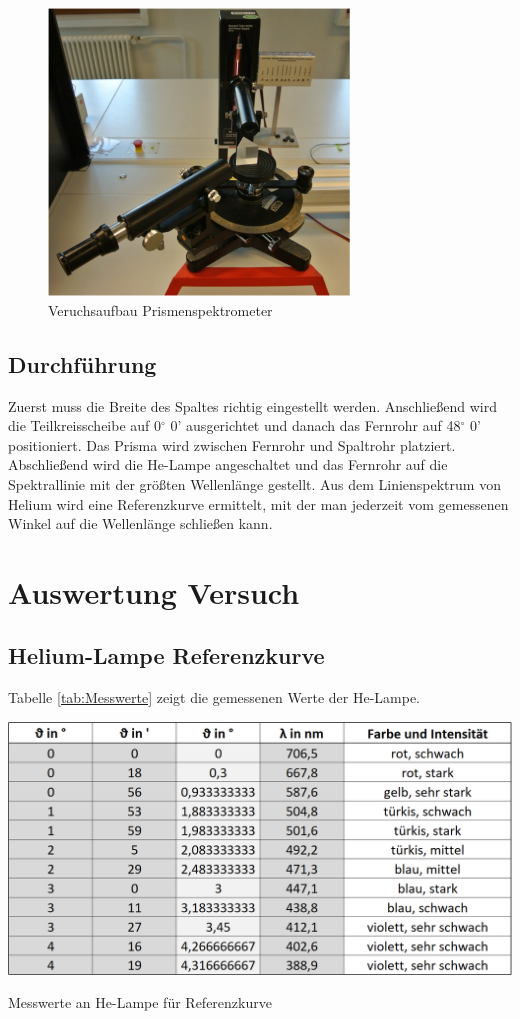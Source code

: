 \documentclass[a4paper]{scrartcl}
\numberwithin{equation}{subsection}
\begin{document}
\begin{figure}[H]
	\includegraphics[width=8cm]{Abbildungen/Aufbau}
	\centering
	\caption{Veruchsaufbau Prismenspektrometer \cite{anl}}
	\centering
	\label{fig:Aufbau}
\end{figure}

\subsection{Durchführung}
Zuerst muss die Breite des Spaltes richtig eingestellt werden.
Anschließend wird die Teilkreisscheibe auf 0$^\circ$ 0' ausgerichtet und danach das Fernrohr auf 48$^\circ$ 0' positioniert.
Das Prisma wird zwischen Fernrohr und Spaltrohr platziert.
Abschließend wird die He-Lampe angeschaltet und das Fernrohr auf die Spektrallinie mit der größten Wellenlänge gestellt.
Aus dem Linienspektrum von Helium wird eine Referenzkurve ermittelt, mit der man jederzeit vom gemessenen Winkel auf die Wellenlänge schließen kann.

\newpage
\section{Auswertung Versuch}
\subsection{Helium-Lampe Referenzkurve}
Tabelle \ref{tab:Messwerte} zeigt die gemessenen Werte der He-Lampe.

\begin{table}[H]
	\includegraphics[width=14cm]{Abbildungen/Messwerte}
	\centering
	\caption{Messwerte an He-Lampe für Referenzkurve}
	\centering
	\label{tab:Messwerte}
\end{table}
\end{document}
